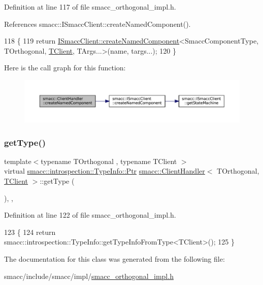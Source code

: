 Definition at line 117 of file smacc\+\_\+orthogonal\+\_\+impl.\+h.



References smacc\+::\+I\+Smacc\+Client\+::create\+Named\+Component().


\begin{DoxyCode}
118     \{
119         \textcolor{keywordflow}{return} \hyperlink{classsmacc_1_1ISmaccClient_affcc2f95bc993b5f07ef0d6ab6eec8f1}{ISmaccClient::createNamedComponent}<SmaccComponentType, 
      TOrthogonal, \hyperlink{classTClient}{TClient}, TArgs...>(name, targs...);
120     \}
\end{DoxyCode}
Here is the call graph for this function\+:
\nopagebreak
\begin{figure}[H]
\begin{center}
\leavevmode
\includegraphics[width=350pt]{classsmacc_1_1ClientHandler_a33f440a8e06038df0dd291d2ea278f39_cgraph}
\end{center}
\end{figure}
\mbox{\label{classsmacc_1_1ClientHandler_a018a50262de782c479414cf18daddac9}} 
\subsubsection{\texorpdfstring{get\+Type()}{getType()}}
{\footnotesize\ttfamily template$<$typename T\+Orthogonal , typename T\+Client $>$ \\
virtual \hyperlink{classsmacc_1_1introspection_1_1TypeInfo_aa6ffd9c39811d59f7c771941b7fad860}{smacc\+::introspection\+::\+Type\+Info\+::\+Ptr} \hyperlink{classsmacc_1_1ClientHandler}{smacc\+::\+Client\+Handler}$<$ T\+Orthogonal, \hyperlink{classTClient}{T\+Client} $>$\+::get\+Type (\begin{DoxyParamCaption}{ }\end{DoxyParamCaption})\hspace{0.3cm}{\ttfamily [inline]}, {\ttfamily [override]}, {\ttfamily [virtual]}}



Definition at line 122 of file smacc\+\_\+orthogonal\+\_\+impl.\+h.


\begin{DoxyCode}
123     \{
124         \textcolor{keywordflow}{return} smacc::introspection::TypeInfo::getTypeInfoFromType<TClient>();
125     \}
\end{DoxyCode}


The documentation for this class was generated from the following file\+:\begin{DoxyCompactItemize}
\item 
smacc/include/smacc/impl/\hyperlink{smacc__orthogonal__impl_8h}{smacc\+\_\+orthogonal\+\_\+impl.\+h}\end{DoxyCompactItemize}
